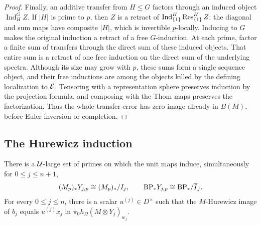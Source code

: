 \begin{proof}
Finally, an additive transfer from \(H\leq G\) factors through
an induced object \(\operatorname{Ind}_H^G Z\).  If
\(|H|\) is prime to \(p\), then \(Z\) is a retract of
\(\operatorname{Ind}_{\{1\}}^H\operatorname{Res}_{\{1\}}^H Z\): the
diagonal and sum maps have composite \(|H|\), which is
invertible \(p\)-locally.  Inducing to \(G\) makes the
original induction a retract of a free \(G\)-induction.  At
each prime, factor a finite sum of transfers through the direct sum
of these induced objects.  That entire sum is a retract of one free
induction on the direct sum of the underlying spectra.  Although its
size may grow with \(p\), these sums form a single sequence
object, and their free inductions are among the objects killed by
the defining localization to \(\mathcal E\).  Tensoring with a
representation sphere preserves induction by the projection
formula, and composing with the Thom maps preserves the
factorization.  Thus the whole transfer error has zero image
already in \(B(M)\), before Euler inversion or completion.
\end{proof}

\subsection{The Hurewicz induction}

\begin{proposition}\label{real:hurewicz}
There is a \(\mathcal U\)-large set of primes on which the unit maps
induce, simultaneously for \(0\leq j\leq n+1\),
\begin{equation}
 (M_p)_*Y_{j,p}\cong (M_p)_*/I_j,
 \qquad
 \mathrm{BP}_*Y_{j,p}\cong\mathrm{BP}_*/\overline I_j.
 \label{real:homology-quotients}
\end{equation}
For every \(0\leq j\leq n\), there is a scalar
\(u^{(j)}\in D^\times\) such that the \(M\)-Hurewicz
image of \(b_j\) equals \(u^{(j)}x_j\) in
\(\pi_0h_\Omega(M\otimes Y_j)_{w_j}\).
\end{proposition}

